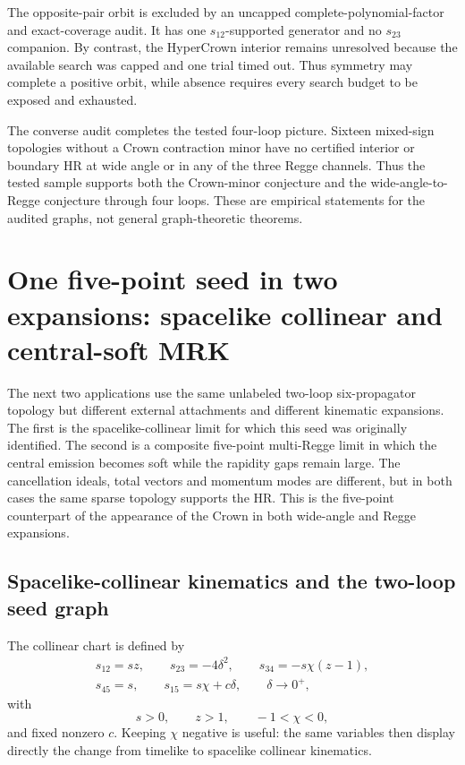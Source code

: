 \documentclass[a4paper,11pt]{article}
\begin{document}
The opposite-pair orbit is excluded by an uncapped complete-polynomial-factor
and exact-coverage audit.  It has one \(s_{12}\)-supported generator and no
\(s_{23}\) companion.  By contrast, the HyperCrown interior remains
unresolved because the available search was capped and one trial timed out.
Thus symmetry may complete a positive orbit, while absence requires every
search budget to be exposed and exhausted.

The converse audit completes the tested four-loop picture.  Sixteen
mixed-sign topologies without a Crown contraction minor have no certified
interior or boundary HR at wide angle or in any of the three Regge channels.
Thus the tested sample supports both the Crown-minor conjecture and the
wide-angle-to-Regge conjecture through four loops.  These are empirical
statements for the audited graphs, not general graph-theoretic theorems.

\section{One five-point seed in two expansions: spacelike collinear and central-soft MRK}
\label{sec:example-five-point}

The next two applications use the same unlabeled two-loop six-propagator
topology but different external attachments and different kinematic
expansions.  The first is the spacelike-collinear limit for which this seed
was originally identified.  The second is a composite five-point
multi-Regge limit in which the central emission becomes soft while the
rapidity gaps remain large.  The cancellation ideals, total vectors and
momentum modes are different, but in both cases the same sparse topology
supports the HR.  This is the five-point counterpart of the appearance of
the Crown in both wide-angle and Regge expansions.

\subsection{Spacelike-collinear kinematics and the two-loop seed graph}

The collinear chart is defined by
\begin{equation}
 \begin{gathered}
 s_{12}=sz,\qquad s_{23}=-4\delta^2,\qquad
 s_{34}=-s\chi(z-1),\\
 s_{45}=s,\qquad s_{15}=s\chi+c\delta,\qquad \delta\to0^+,
 \end{gathered}
 \label{eq:five-kinematics}
\end{equation}
with
\begin{equation}
 s>0,\qquad z>1,\qquad -1<\chi<0,
 \label{eq:five-domain}
\end{equation}
and fixed nonzero \(c\).  Keeping \(\chi\) negative is useful: the same
variables then display directly the change from timelike to spacelike
collinear kinematics.
\end{document}
